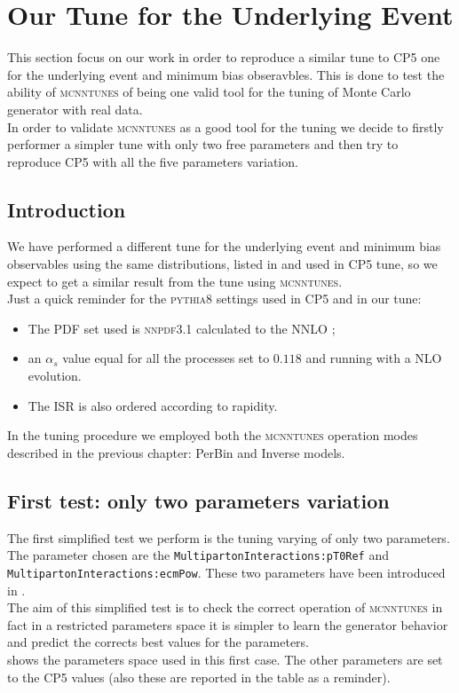 \chapter{Our Tune for the Underlying Event}
\label{chap:OurTunefortheUnderlyingEvent}

This section focus on our work in order to reproduce a similar tune to CP5 one for the underlying event and minimum bias obseravbles. This is done to test the ability of \textsc{mcnntunes} of being one valid tool for the tuning of Monte Carlo generator with real data. 
\\
In order to validate \textsc{mcnntunes} as a good tool for the tuning we decide to firstly performer a simpler tune with only two free parameters and then try to reproduce CP5 \cite{CPtunes} with all the five parameters variation.


\section{Introduction}

We have performed a different tune for the underlying event and minimum bias observables using the same distributions, listed in  and used in CP5 tune, so we expect to get a similar result from the tune using  \textsc{mcnntunes}.
\\
Just a quick reminder for the \textsc{pythia8} settings used in CP5 and in our tune:
\begin{itemize}
	\item The PDF set used is \textsc{nnpdf}3.1 calculated to the NNLO \cite{NNPDF:2017mvq}; 
	\item an $\alpha_s$ value equal for all the processes set to $0.118$ and running with a NLO evolution.
	\item The ISR is also ordered according to rapidity.
\end{itemize}
In the tuning procedure we employed both the \textsc{mcnntunes} operation modes described in the previous chapter: PerBin and Inverse models.

\section{First test: only two parameters variation}

The first simplified test we perform is the tuning varying of only two parameters. The parameter chosen are the \texttt{Multiparton}\-\texttt{Interactions:}\-\texttt{pT0Ref} and 
\texttt{Multiparton}\-\texttt{Interactions:}\-\texttt{ecmPow}. These two parameters have been introduced in .
\\
The aim of this simplified test is to check the correct operation of \textsc{mcnntunes} in fact in a restricted parameters space it is simpler to learn the generator behavior and predict the corrects best values for the parameters. 
\\
 shows the parameters space used in this first case. The other parameters are set to the CP5 values (also these are reported in the table as a reminder).

